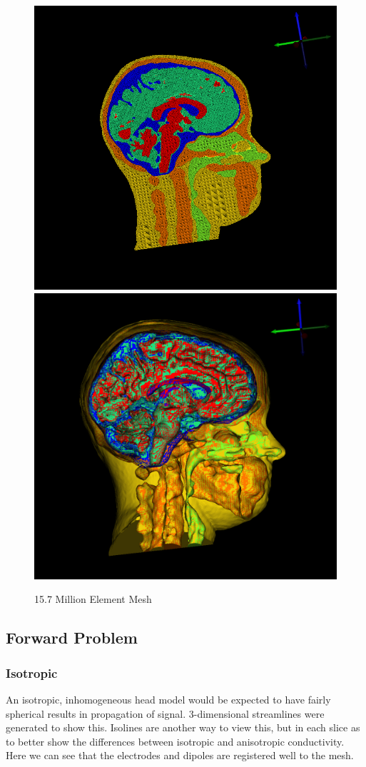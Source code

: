 \begin{figure}[H]
\begin{center}
\includegraphics[width=.49\textwidth]{Figures/smallmesh_2}
\includegraphics[width=.49\textwidth]{Figures/smallmesh_surface}
\caption{15.7 Million Element Mesh}
\label{fig:smallmesh}
\end{center}
\end{figure}

\subsection{Forward Problem}

\subsubsection{Isotropic}

An isotropic, inhomogeneous head model would be expected to have fairly spherical results in propagation of signal. 3-dimensional streamlines were generated to show this. Isolines are another way to view this, but in each slice as to better show the differences between isotropic and anisotropic conductivity. Here we can see that the electrodes and dipoles are registered well to the mesh. 

